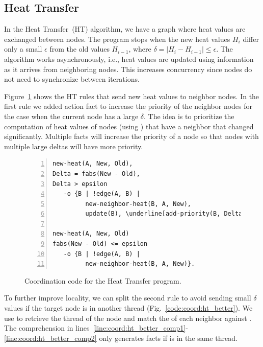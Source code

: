 \clearpage
\subsection{Heat Transfer}

In the Heat Transfer~(HT) algorithm, we have a graph where heat values are
exchanged between nodes. The program stops when the new heat values $H_i$
differ only a small $\epsilon$ from the old values $H_{i-1}$, where $\delta =
|H_i - H_{i-1}| \le \epsilon$. The algorithm works asynchronously, i.e., heat
values are updated using information as it arrives from neighboring nodes. This
increases concurrency since nodes do not need to synchronize between
iterations.

Figure~\ref{code:coord:ht} shows the HT rules that send new heat values to
neighbor nodes. In the first rule we added  action fact to
increase the priority of the neighbor nodes for the case when the current node has a large
$\delta$. The idea is to prioritize the computation of heat values of nodes
(using ) that have a neighbor that changed significantly. Multiple
 facts will increase the priority of a node so that nodes
with multiple large deltas will have more priority.

\begin{figure}[h!]
\begin{Verbatim}[numbers=left,fontsize=\codesize,commandchars=\\\[\]]
new-heat(A, New, Old),
Delta = fabs(New - Old),
Delta > epsilon
   -o {B | !edge(A, B) |
         new-neighbor-heat(B, A, New),
         update(B), \underline[add-priority(B, Delta)]}.

new-heat(A, New, Old)
fabs(New - Old) <= epsilon
   -o {B | !edge(A, B) |
         new-neighbor-heat(B, A, New)}.
\end{Verbatim}
  \caption{Coordination code for the Heat Transfer program.}
  \label{code:coord:ht}
\end{figure}

To further improve locality, we can split the second rule to avoid sending small
$\delta$ values if the target node is in another thread
(Fig.~\ref{code:coord:ht_better}). We use  to retrieve the
thread  of the node  and match the  of each
neighbor  against . The comprehension in
lines~\ref{line:coord:ht_better_comp1}-\ref{line:coord:ht_better_comp2} only
generates  facts if  is in the same thread.

